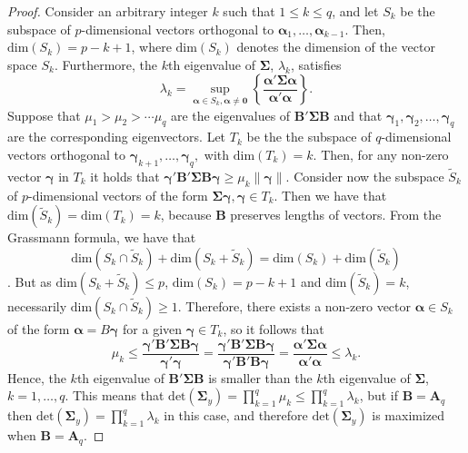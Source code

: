 \documentclass[11pt, oneside]{book}
\theoremstyle{plain}
\theoremstyle{remark}
\begin{document}
\begin{proof}
    Consider an arbitrary integer $k$ such that $1\leq k\leq q$, and let $S_k$
    be the subspace of $p$-dimensional vectors orthogonal to
    $\bm{\alpha}_1,\dots,\bm{\alpha}_{k-1}$. Then, $\text{dim}(S_k) = p-k+1$,
    where $\text{dim}(S_k)$ denotes the dimension of the vector space $S_k$.
    Furthermore, the $k$th eigenvalue of $\mathbf{\Sigma}$, $\lambda_k$,
    satisfies $$\lambda_k = \sup\limits_{\bm{\alpha}\in S_k, \bm{\alpha\neq
    0}}\left\{\frac{\bm{\alpha'}\mathbf{\Sigma}\bm{\alpha}}{\bm{\alpha'\alpha}}
    \right\}.$$ Suppose that $\mu_1>\mu_2>\cdots\mu_q$ are the eigenvalues of
    $\mathbf{B'\Sigma B}$ and that
    $\bm{\gamma}_1,\bm{\gamma}_2,\dots,\bm{\gamma}_q$ are the corresponding
    eigenvectors. Let $T_k$ be the the subspace of $q$-dimensional vectors
    orthogonal to $\bm{\gamma}_{k+1},\dots,\bm{\gamma}_{q},$ with
    $\text{dim}(T_k) = k$. Then, for any non-zero vector $\bm{\gamma}$ in $T_k$
    it holds that $\bm{\gamma}'\mathbf{B'\Sigma
    B}\bm{\gamma}\geq \mu_k\lVert\bm{\gamma}\lVert.$ Consider now the
    subspace $\tilde{S}_k$ of $p$-dimensional vectors of the form
    $\mathbf{\Sigma}\bm{\gamma}, \bm{\gamma}\in T_k$. Then we have that
    $\text{dim}(\tilde{S}_k) = \text{dim}(T_k)=k$, because $\mathbf{B}$
    preserves lengths of vectors. From the Grassmann formula, we have that
    $$\text{dim}(S_k\cap\tilde{S}_k) + \text{dim}(S_k + \tilde{S}_k) =
    \text{dim}(S_k) + \text{dim}(\tilde{S}_k)$$. But as $\text{dim}(S_k +
    \tilde{S}_k)\leq p$, $\text{dim}(S_k) = p-k+1$ and $\text{dim}(\tilde{S}_k)
    = k$, necessarily $\text{dim}(S_k\cap\tilde{S}_k)\geq 1$. Therefore, there
    exists a non-zero vector $\bm{\alpha}\in S_k$ of the form $\bm{\alpha} =
    B\bm{\gamma}$ for a given $\bm{\gamma}\in T_k$, so it follows that $$\mu_k
    \leq \frac{\bm{\gamma}'\mathbf{B'\Sigma
    B}\bm{\gamma}}{\bm{\gamma}'\bm{\gamma}} = \frac{\bm{\gamma}'\mathbf{B'\Sigma
    B}\bm{\gamma}}{\bm{\gamma}'\mathbf{B'B}\bm{\gamma}} =
    \frac{\bm{\alpha'}\mathbf{\Sigma}\bm{\alpha}}{\bm{\alpha'\alpha}}\leq  
    \lambda_k.$$ Hence, the $k$th eigenvalue of $\mathbf{B'\Sigma B}$ is smaller
    than the $k$th eigenvalue of $\mathbf{\Sigma}$, $k=1,\dots,q.$ This means
    that $\text{det}(\mathbf{\Sigma}_y) = \prod_{k=1}^q\mu_k \leq
    \prod_{k=1}^q\lambda_k$, but if $\mathbf{B}=\mathbf{A}_q$ then
    $\text{det}(\mathbf{\Sigma}_y) = \prod_{k=1}^q\lambda_k$ in this case, and
    therefore $\text{det}(\mathbf{\Sigma}_y)$ is maximized when $\mathbf{B} =
    \mathbf{A}_q.$
\end{proof}    
\end{document}
